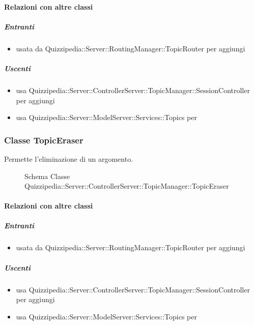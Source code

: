 \paragraph{Relazioni con altre classi}
\subparagraph{Entranti}
\begin{itemize}
\item usata da Quizzipedia::Server::RoutingManager::TopicRouter per aggiungi
\end{itemize}
\subparagraph{Uscenti}
\begin{itemize}
\item usa Quizzipedia::Server::ControllerServer::TopicManager::SessionController per aggiungi
\item usa Quizzipedia::Server::ModelServer::Services::Topics per 
\end{itemize}
\subsubsection{Classe TopicEraser}
Permette l'eliminazione di un argomento.
\begin{figure}[H]
\centering
\noindent{}
\caption[Schema Classe TopicEraser]{Schema Classe Quizzipedia::Server::ControllerServer::TopicManager::TopicEraser}
\end{figure}
\paragraph{Relazioni con altre classi}
\subparagraph{Entranti}
\begin{itemize}
\item usata da Quizzipedia::Server::RoutingManager::TopicRouter per aggiungi
\end{itemize}
\subparagraph{Uscenti}
\begin{itemize}
\item usa Quizzipedia::Server::ControllerServer::TopicManager::SessionController per aggiungi
\item usa Quizzipedia::Server::ModelServer::Services::Topics per 
\end{itemize}
